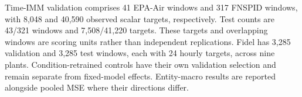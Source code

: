 Time-IMM validation comprises 41 EPA-Air windows and 317 FNSPID windows, with 8,048 and 40,590 observed scalar targets, respectively. Test counts are 43/321 windows and 7,508/41,220 targets. These targets and overlapping windows are scoring units rather than independent replications. Fidel has 3,285 validation and 3,285 test windows, each with 24 hourly targets, across nine plants. Condition-retrained controls have their own validation selection and remain separate from fixed-model effects. Entity-macro results are reported alongside pooled MSE where their directions differ.
